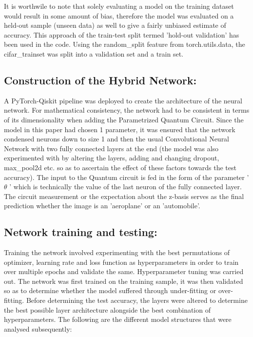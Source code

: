 \documentclass[10pt]{article}
\begin{document}
It is worthwile to note that solely evaluating a model on the training dataset would result in some amount of bias, therefore the model was evaluated on a held-out sample (unseen data) as well to give a fairly unbiased estimate of accuracy. This approach of the train-test split termed 'hold-out validation' has been used in the code. Using the random\_split feature from torch.utils.data, the cifar\_trainset was split into a validation set and a train set.

\subsection{Construction of the Hybrid Network:}

A PyTorch-Qiskit pipeline was deployed to create the architecture of the neural network. For mathematical consistency, the network had to be consistent in terms of its dimensionality when adding the Parametrized Quantum Circuit. Since the model in this paper had chosen 1 parameter, it was ensured that the network condensed neurons down to size 1 and then the usual Convolutional Neural Network with two fully connected layers at the end (the model was also experimented with by altering the layers, adding and changing dropout, max\_pool2d etc. so as to ascertain the effect of these factors towards the test accuracy). The input to the Quantum circuit is fed in the form of the parameter ' $\theta$ ' which is technically the value of the last neuron of the fully connected layer. The circuit measurement or the expectation about the z-basis serves as the final prediction whether the image is an 'aeroplane' or an 'automobile'. 

\subsection{Network training and testing:}

Training the network involved experimenting with the best permutations of optimizer, learning rate and loss function as hyperparameters in order to train over multiple epochs and validate the same. Hyperparameter tuning was carried out. The network was first trained on the training sample, it was then validated so as to determine whether the model suffered through under-fitting or over-fitting. Before determining the test accuracy, the layers were altered to determine the best possible layer architecture alongside the best combination of hyperparameters. The following are the different model structures that were analysed subsequently:
\end{document}

